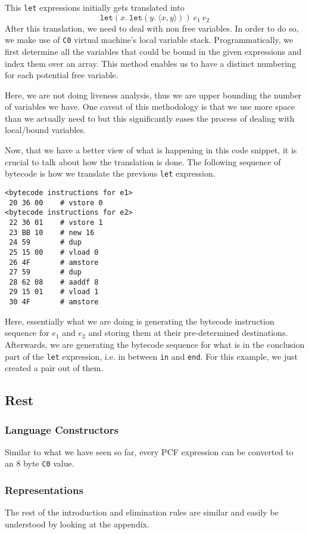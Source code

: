 \documentclass{acm_proc_article-sp}
\newcommand{\m}[1]{\texttt{#1}}
\begin{document}
This \m{let} expressions initially gets translated into
$$\m{let}(x.~\m{let}(y.~\langle x,y\rangle))~e_1 ~ e_2$$
After this translation, we need to deal with non free variables. In order to do so, we make use of \m{C0} virtual machine's local variable stack. Programmatically, we first determine all the variables that could be bound in the given expressions and index them over an array. This method enables us to have a distinct numbering for each potential free variable.

Here, we are not doing liveness analysis, thus we are upper bounding the number of variables we have. One caveat of this methodology is that we use more space than we actually need to but this significantly eases the process of dealing with local/bound variables.

Now, that we have a better view of what is happening in this code snippet, it is crucial to talk about how the translation is done. The following sequence of bytecode is how we translate the previous \m{let} expression.

\begin{verbatim}
<bytecode instructions for e1>
 20 36 00    # vstore 0
<bytecode instructions for e2>
 22 36 01    # vstore 1
 23 BB 10    # new 16
 24 59       # dup          
 25 15 00    # vload 0 
 26 4F       # amstore  
 27 59       # dup          
 28 62 08    # aaddf 8 
 29 15 01    # vload 1 
 30 4F       # amstore 
\end{verbatim}

Here, essentially what we are doing is generating the bytecode instruction sequence for $e_1$ and $e_2$ and storing them at their pre-determined destinations. Afterwards, we are generating the bytecode sequence for what is in the conclusion part of the \m{let} expression, i.e. in between \m{in} and \m{end}. For this example, we just created a pair out of them.

\subsection{Rest}
\subsubsection{Language Constructors}
Similar to what we have seen so far, every PCF expression can be converted to an 8 byte \m{C0} value.
\subsubsection{Representations}
The rest of the introduction and elimination rules are similar and easily be understood by looking at the appendix.
\end{document}
